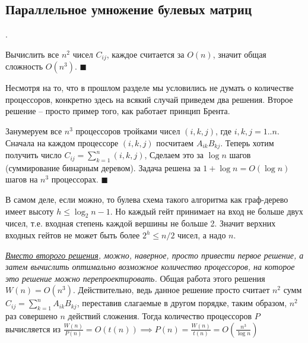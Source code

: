 \subsection{Параллельное умножение булевых матриц}

.

 Вычислить все $n^2$ чисел $C_{ij}$, каждое считается за $O(n)$, значит общая сложность $O(n^3)$.  $\blacksquare$

Несмотря на то, что в прошлом разделе мы условились не думать о количестве процессоров, конкретно здесь на всякий случай приведем два решения. Второе решение -- просто пример того, как работает принцип Брента. 

 Занумеруем все $n^3$ процессоров тройками чисел $(i, k, j)$, где $i,k,j=1..n$. Сначала на каждом процессоре $(i, k, j)$ посчитаем $A_{ik}B_{kj}$. Теперь хотим получить число $C_{ij} = \sum_{k=1}^n (i, k, j)$, Сделаем это за $\log n$ шагов (суммирование бинарным деревом). Задача решена за $1+\log n = O(\log n) $ шагов на $n^3$ процессорах. $\blacksquare$

 В самом деле, если можно, то булева схема такого алгоритма как граф-дерево имеет высоту $h \leq \log_2 n - 1$. Но каждый гейт принимает на вход не больше двух чисел, т.е. входная степень каждой вершины не больше 2. Значит верхних входных гейтов не может быть более $2^h \leq n/2$  чисел, а надо $n$.

\textit{\underline{Вместо второго решения}, можно, наверное, просто привести первое решение, а затем вычислить оптимально возможное количество процессоров, на которое это решение можно перепроектировать.} Общая работа этого решения $W(n) = O(n^3)$. Действительно, ведь данное решение просто считает $n^2$ сумм $C_{ij} = \sum_{k=1}^n A_{ik}B_{kj}$, переставив слагаемые в другом порядке, таким образом, $n^2$ раз совершено $n$ действий сложения. Тогда количество процессоров $P$ вычисляется из $\frac{W(n)}{P(n)} = O(t(n)) \implies P(n) = \frac{W(n)}{t(n)} = O(\frac{n^3}{\log n})$

